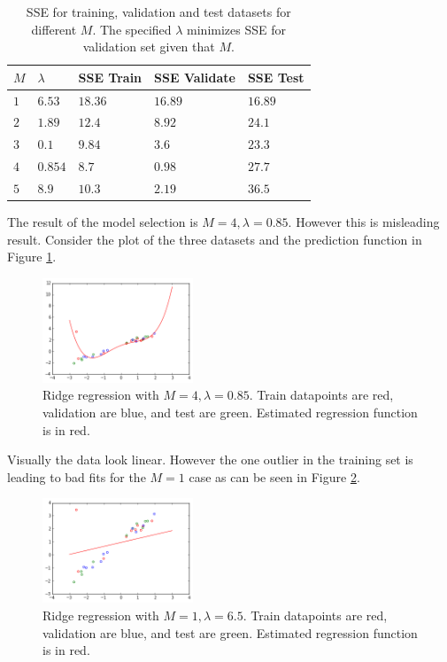 \documentclass{article}
\begin{document}
\begin{table}
\begin{tabular}{|l|l|l|l|l|}
\hline 
$M$ & $\lambda$ & SSE Train & SSE Validate & SSE Test \\ \hline
$1$ & $6.53$ & $18.36$ & $16.89$ & $16.89$ \\ \hline
$2$ & $1.89$ & $12.4$ & $8.92$ & $24.1$ \\ \hline
$3$ & $0.1$ & $9.84$ & $3.6$ & $23.3$ \\ \hline
$4$ & $0.854$ & $8.7$ & $0.98$ & $27.7$ \\ \hline
$5$ & $8.9$ & $10.3$ & $2.19$ & $36.5$ \\
\hline
\end{tabular}
\label{model-selection}
\caption{SSE for training, validation and test datasets for different $M$. The specified $\lambda$ minimizes SSE for validation set given that $M$.}
\end{table}
%
%
The result of the model selection is $M=4,\lambda=0.85$. However this is misleading result. Consider the plot of the three datasets and the prediction function in Figure \ref{m-4-model-selection}.
%
%
\begin{figure}[h]
\centering
\includegraphics[width=0.4\textwidth]{m-4-model-selection}
\caption{Ridge regression with $M = 4, \lambda = 0.85$. Train datapoints are red, validation are blue, and test are green. Estimated regression function is in red.}
\label{m-4-model-selection}
\end{figure}
%
%
Visually the data look linear. However the one outlier in the training set is leading to bad fits for the $M = 1$ case as can be seen in Figure \ref{m-1-model-selection}.
%
\begin{figure}[h]
\centering
\includegraphics[width=0.4\textwidth]{m-1-model-selection}
\caption{Ridge regression with $M = 1, \lambda = 6.5$. Train datapoints are red, validation are blue, and test are green. Estimated regression function is in red.}
\label{m-1-model-selection}
\end{figure}
\end{document}
